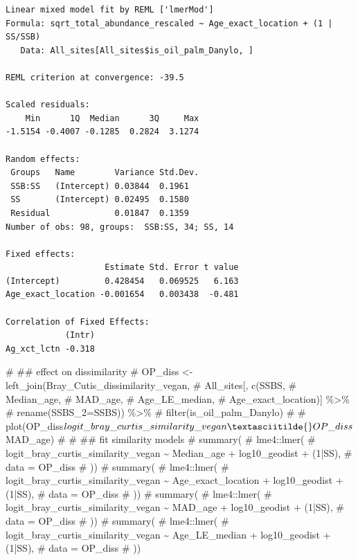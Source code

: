 \documentclass[
  letterpaper,
  DIV=11,
  numbers=noendperiod]{scrartcl}
\newenvironment{Shaded}{\begin{snugshade}}{\end{snugshade}}
\newcommand{\CommentTok}[1]{\textcolor[rgb]{0.37,0.37,0.37}{#1}}
\begin{document}
\begin{verbatim}
Linear mixed model fit by REML ['lmerMod']
Formula: sqrt_total_abundance_rescaled ~ Age_exact_location + (1 | SS/SSB)
   Data: All_sites[All_sites$is_oil_palm_Danylo, ]

REML criterion at convergence: -39.5

Scaled residuals: 
    Min      1Q  Median      3Q     Max 
-1.5154 -0.4007 -0.1285  0.2824  3.1274 

Random effects:
 Groups   Name        Variance Std.Dev.
 SSB:SS   (Intercept) 0.03844  0.1961  
 SS       (Intercept) 0.02495  0.1580  
 Residual             0.01847  0.1359  
Number of obs: 98, groups:  SSB:SS, 34; SS, 14

Fixed effects:
                    Estimate Std. Error t value
(Intercept)         0.428454   0.069525   6.163
Age_exact_location -0.001654   0.003438  -0.481

Correlation of Fixed Effects:
            (Intr)
Ag_xct_lctn -0.318
\end{verbatim}

\begin{Shaded}
\begin{Highlighting}[]
\CommentTok{\# \#\# effect on dissimilarity}
\CommentTok{\# OP\_diss \textless{}{-} left\_join(Bray\_Cutis\_dissimilarity\_vegan, }
\CommentTok{\#                      All\_sites[, c(\textquotesingle{}SSBS\textquotesingle{}, }
\CommentTok{\#                                    \textquotesingle{}Median\_age\textquotesingle{}, }
\CommentTok{\#                                    \textquotesingle{}MAD\_age\textquotesingle{}, }
\CommentTok{\#                                    \textquotesingle{}Age\_LE\_median\textquotesingle{},}
\CommentTok{\#                                    \textquotesingle{}Age\_exact\_location\textquotesingle{})] \%\textgreater{}\% }
\CommentTok{\#                        rename(SSBS\_2=SSBS)) \%\textgreater{}\% }
\CommentTok{\#   filter(is\_oil\_palm\_Danylo)}
\CommentTok{\# }
\CommentTok{\# plot(OP\_diss$logit\_bray\_curtis\_similarity\_vegan\textasciitilde{}OP\_diss$MAD\_age)}
\CommentTok{\# }
\CommentTok{\# \#\# fit similarity models}
\CommentTok{\# summary(}
\CommentTok{\# lme4::lmer(}
\CommentTok{\#   logit\_bray\_curtis\_similarity\_vegan \textasciitilde{}  Median\_age + log10\_geodist + (1|SS), }
\CommentTok{\#   data = OP\_diss}
\CommentTok{\#   ))}
\CommentTok{\# summary(}
\CommentTok{\# lme4::lmer(}
\CommentTok{\#   logit\_bray\_curtis\_similarity\_vegan \textasciitilde{}  Age\_exact\_location + log10\_geodist + (1|SS), }
\CommentTok{\#   data = OP\_diss}
\CommentTok{\#   ))}
\CommentTok{\# summary(}
\CommentTok{\# lme4::lmer(}
\CommentTok{\#   logit\_bray\_curtis\_similarity\_vegan \textasciitilde{}  MAD\_age + log10\_geodist + (1|SS), }
\CommentTok{\#   data = OP\_diss}
\CommentTok{\#   ))}
\CommentTok{\# summary(}
\CommentTok{\# lme4::lmer(}
\CommentTok{\#   logit\_bray\_curtis\_similarity\_vegan \textasciitilde{}  Age\_LE\_median + log10\_geodist + (1|SS), }
\CommentTok{\#   data = OP\_diss}
\CommentTok{\#   ))}
\end{Highlighting}
\end{Shaded}
\end{document}
